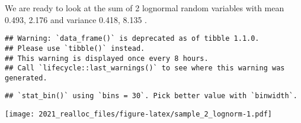 \documentclass[
]{book}
\newenvironment{Shaded}{\begin{snugshade}}{\end{snugshade}}
\newcommand{\ControlFlowTok}[1]{\textcolor[rgb]{0.13,0.29,0.53}{\textbf{#1}}}
\newcommand{\DataTypeTok}[1]{\textcolor[rgb]{0.13,0.29,0.53}{#1}}
\newcommand{\DecValTok}[1]{\textcolor[rgb]{0.00,0.00,0.81}{#1}}
\newcommand{\KeywordTok}[1]{\textcolor[rgb]{0.13,0.29,0.53}{\textbf{#1}}}
\newcommand{\NormalTok}[1]{#1}
\newcommand{\OperatorTok}[1]{\textcolor[rgb]{0.81,0.36,0.00}{\textbf{#1}}}
\newcommand{\StringTok}[1]{\textcolor[rgb]{0.31,0.60,0.02}{#1}}
\begin{document}
We are ready to look at the sum of 2 lognormal random variables with mean 0.493, 2.176 and variance 0.418, 8.135 .

\begin{Shaded}
\end{Shaded}

\begin{verbatim}
## Warning: `data_frame()` is deprecated as of tibble 1.1.0.
## Please use `tibble()` instead.
## This warning is displayed once every 8 hours.
## Call `lifecycle::last_warnings()` to see where this warning was generated.
\end{verbatim}

\begin{Shaded}
\end{Shaded}

\begin{verbatim}
## `stat_bin()` using `bins = 30`. Pick better value with `binwidth`.
\end{verbatim}

\texttt{[image: 2021\_realloc\_files/figure-latex/sample\_2\_lognorm-1.pdf]}
\end{document}
